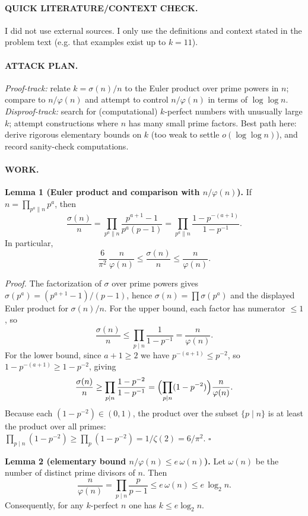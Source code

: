 \paragraph{QUICK LITERATURE/CONTEXT CHECK.}
I did not use external sources. I only use the definitions and context stated in the problem text (e.g. that examples exist up to $k=11$).

\paragraph{ATTACK PLAN.}
\emph{Proof-track:} relate $k=\sigma(n)/n$ to the Euler product over prime powers in $n$; compare to $n/\varphi(n)$ and attempt to control $n/\varphi(n)$ in terms of $\log\log n$.
\emph{Disproof-track:} search for (computational) $k$-perfect numbers with unusually large $k$; attempt constructions where $n$ has many small prime factors.
Best path here: derive rigorous elementary bounds on $k$ (too weak to settle $o(\log\log n)$), and record sanity-check computations.

\paragraph{WORK.}
\textbf{Lemma 1 (Euler product and comparison with $n/\varphi(n)$).}
If $n=\prod_{p^a\parallel n} p^a$, then
\[
\frac{\sigma(n)}{n}=\prod_{p^a\parallel n}\frac{p^{a+1}-1}{p^a(p-1)}
=\prod_{p^a\parallel n}\frac{1-p^{-(a+1)}}{1-p^{-1}}.
\]
In particular,
\[
\frac{6}{\pi^2}\,\frac{n}{\varphi(n)}\le \frac{\sigma(n)}{n}\le \frac{n}{\varphi(n)}.
\]

\emph{Proof.}
The factorization of $\sigma$ over prime powers gives $\sigma(p^a)=(p^{a+1}-1)/(p-1)$, hence $\sigma(n)=\prod\sigma(p^a)$ and the displayed Euler product for $\sigma(n)/n$.
For the upper bound, each factor has numerator $\le 1$, so
\[
\frac{\sigma(n)}{n}\le \prod_{p\mid n}\frac{1}{1-p^{-1}}=\frac{n}{\varphi(n)}.
\]
For the lower bound, since $a+1\ge 2$ we have $p^{-(a+1)}\le p^{-2}$, so $1-p^{-(a+1)}\ge 1-p^{-2}$, giving
\[
\frac{\sigma(n)}{n}\ge \prod_{p\mid n}\frac{1-p^{-2}}{1-p^{-1}}
=\Bigl(\prod_{p\mid n}(1-p^{-2})\Bigr)\frac{n}{\varphi(n)}.
\]
Because each $(1-p^{-2})\in(0,1)$, the product over the subset $\{p\mid n\}$ is at least the product over all primes:
$\prod_{p\mid n}(1-p^{-2})\ge \prod_{p}(1-p^{-2})=1/\zeta(2)=6/\pi^2$.
\hfill$\square$

\textbf{Lemma 2 (elementary bound $n/\varphi(n)\le e\,\omega(n)$).}
Let $\omega(n)$ be the number of distinct prime divisors of $n$. Then
\[
\frac{n}{\varphi(n)}=\prod_{p\mid n}\frac{p}{p-1}\le e\,\omega(n)\le e\,\log_2 n.
\]
Consequently, for any $k$-perfect $n$ one has $k\le e\log_2 n$.

